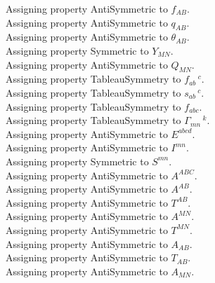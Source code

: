 \documentclass[11pt]{article}
\begin{document}
Assigning property AntiSymmetric to ${f}_{A B}$.
\\
Assigning property AntiSymmetric to ${q}_{A B}$.
\\
Assigning property AntiSymmetric to ${\theta}_{A B}$.
\\
Assigning property Symmetric to ${Y}_{M N}$.
\\
Assigning property AntiSymmetric to ${Q}_{M N}$.
\\
Assigning property TableauSymmetry to ${f}_{a b}\,^{c}$.
\\
Assigning property TableauSymmetry to ${s}_{a b}\,^{c}$.
\\
Assigning property TableauSymmetry to ${f}_{a b c}$.
\\
Assigning property TableauSymmetry to ${\Gamma}_{m n}\,^{k}$.
\\
Assigning property AntiSymmetric to ${E}^{a b c d}$.
\\
Assigning property AntiSymmetric to ${I}^{m n}$.
\\
Assigning property Symmetric to ${S}^{m n}$.
\\
Assigning property AntiSymmetric to ${A}^{A B C}$.
\\
Assigning property AntiSymmetric to ${A}^{A B}$.
\\
Assigning property AntiSymmetric to ${T}^{A B}$.
\\
Assigning property AntiSymmetric to ${A}^{M N}$.
\\
Assigning property AntiSymmetric to ${T}^{M N}$.
\\
Assigning property AntiSymmetric to ${A}_{A B}$.
\\
Assigning property AntiSymmetric to ${T}_{A B}$.
\\
Assigning property AntiSymmetric to ${A}_{M N}$.
\\
\end{document}
